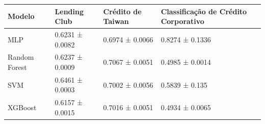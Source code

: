 \begin{tabular}{llll}
\toprule
Modelo & Lending Club & Crédito de Taiwan & Classificação de Crédito Corporativo \\
\midrule
MLP & 0.6231 ± 0.0082 & 0.6974 ± 0.0066 & 0.8274 ± 0.1336 \\
Random Forest & 0.6237 ± 0.0009 & 0.7067 ± 0.0051 & 0.4985 ± 0.0014 \\
SVM & 0.6461 ± 0.0003 & 0.7002 ± 0.0056 & 0.5839 ± 0.135 \\
XGBoost & 0.6157 ± 0.0015 & 0.7016 ± 0.0051 & 0.4934 ± 0.0065 \\
\bottomrule
\end{tabular}
